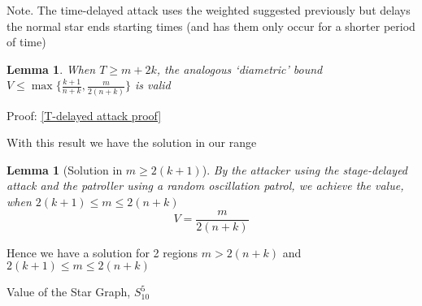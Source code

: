 \documentclass[a4paper,10pt]{article}
\newtheorem{lemma}[theorem]{Lemma}
\theoremstyle{definition}
\theoremstyle{definition}
\theoremstyle{remark}
\theoremstyle{definition}
\begin{document}
\begin{myfigure}
\begin{center}
\end{center}
\end{myfigure}

Note. The time-delayed attack uses the weighted suggested previously but delays the normal star ends starting times (and has them only occur for a shorter period of time)


\begin{lemma}
When $T \geq m+2k$, the analogous `diametric' bound $V \leq \max \{ \frac{k+1}{n+k} , \frac{m}{2(n+k)}   \}$ is valid
\end{lemma}

Proof: \ref{T-delayed attack proof}

With this result we have the solution in our range

\begin{lemma}[Solution in $m \geq 2(k+1)$]
By the attacker using the stage-delayed attack and the patroller using a random oscillation patrol, we achieve the value, when $2(k+1) \leq m \leq 2(n+k)$
$$V=\frac{m}{2(n+k)}$$
\end{lemma}

Hence we have a solution for 2 regions $m > 2(n+k)$ and $2(k+1) \leq m \leq 2(n+k)$

\begin{myfigure}
\resizebox{0.95\linewidth}{!}{
}
\caption{Value of the Star Graph, $S_{10}^{5}$}
\end{myfigure}
\end{document}
